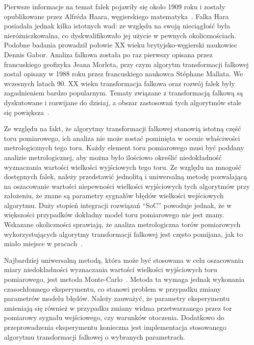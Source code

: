 Pierwsze informacje na temat falek pojawiły się około 1909 roku i zostały opublikowane przez Alfréda Haara, węgierskiego matematyka~\cite{haar_basics}. Falka Hara posiadała jednak kilka istotnych wad: ze względu na swoją nieciągłość była nieróżniczkowalna, co dyskwalifikowało jej użycie w pewnych okolicznościach. Podobne badania prowadził połowie XX wieku brytyjsko-węgierski naukowiec Dennis Gabor. Analiza falkowa została po raz pierwszy opisana przez francuskiego geofizyka Jeana Morleta, przy czym algorytm transformacji falkowej został opisany w 1988 roku przez francuskiego naukowca Stéphane Mallata. We wczesnych latach 90. XX wieku transformacja falkowa oraz rozwój falek były zagadnieniem bardzo popularnym. Tematy związane z transformacją falkową są dyskutowane i rozwijane do dzisiaj, a obszar zastosowań tych algorytmów stale się powiększa~\cite{akujuobi_applications}.

Ze względu na fakt, że algorytmy transformacji falkowej stanowią istotną część toru pomiarowego, ich analiza nie może zostać pominięta w ocenie właściwości metrologicznych tego toru. Każdy element toru pomiarowego musi być poddany analizie metrologicznej, aby można było ilościowo określić niedokładność wyznaczania wartości wielkości wyjściowych tego toru. Ze względu na mnogość dostępnych falek, należy przedstawić jednolitą i uniwersalną metodę pozwalającą na oszacowanie wartości niepewności wielkości wyjściowych tych algorytmów przy założeniu, że znane są parametry sygnałów błędów wielkości wejściowych algorytmu. Duży stopień integracji rozwiązań \enquote{SoC} powoduje jednak, że w większości przypadków dokładny model toru pomiarowego nie jest znany. Wskazane okoliczności sprawiają, że analiza metrologiczna torów pomiarowych wykorzystujących algorytmy transformacji falkowej jest często pomijana, jak to miało miejsce w pracach~\cite{wallen_handbook, anping_seismic, yan_mechanics, niedopytalski_ene, niedopytalski_zwar}.

Najbardziej uniwersalną metodą, która może być stosowana w celu oszacowania miary niedokładności wyznaczania wartości wielkości wyjściowych toru pomiarowego, jest metoda Monte-Carlo~\cite{jcgm_montecarlo, janssen_montecarlo}. Metoda ta wymaga jednak wykonania czasochłonnego eksperymentu, co stanowi problem w przypadku zmiany parametrów modelu błędów. Należy zauważyć, że parametry eksperymentu zmieniają się również w przypadku zmiany widma przetwarzanego przez tor pomiarowy sygnału wejściowego, czy warunków otoczenia. Dodatkowo do przeprowadzenia eksperymentu konieczna jest implementacja stosowanego algorytmu transformacji falkowej o wybranych parametrach.

